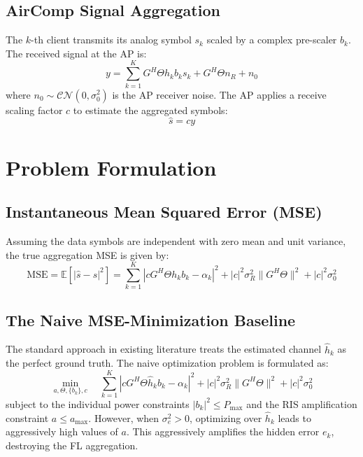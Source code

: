 \documentclass[lettersize,journal]{IEEEtran}
\begin{document}
\subsection{AirComp Signal Aggregation}
The $k$-th client transmits its analog symbol $s_k$ scaled by a complex pre-scaler $b_k$. The received signal at the AP is:
\begin{equation}
y = \sum_{k=1}^K G^H \Theta h_k b_k s_k + G^H \Theta n_R + n_0
\end{equation}
where $n_0 \sim \mathcal{CN}(0, \sigma_0^2)$ is the AP receiver noise. The AP applies a receive scaling factor $c$ to estimate the aggregated symbols:
\begin{equation}
\hat{s} = c y
\end{equation}

\section{Problem Formulation}

\subsection{Instantaneous Mean Squared Error (MSE)}
Assuming the data symbols are independent with zero mean and unit variance, the true aggregation MSE is given by:
\begin{equation}
\text{MSE} = \mathbb{E}[|\hat{s} - s|^2] = \sum_{k=1}^K |c G^H \Theta h_k b_k - \alpha_k|^2 + |c|^2 \sigma_R^2 \|G^H \Theta\|^2 + |c|^2 \sigma_0^2
\end{equation}

\subsection{The Naive MSE-Minimization Baseline}
The standard approach in existing literature treats the estimated channel $\hat{h}_k$ as the perfect ground truth. The naive optimization problem is formulated as:
\begin{equation}
\min_{a, \Theta, \{b_k\}, c} \quad \sum_{k=1}^K |c G^H \Theta \hat{h}_k b_k - \alpha_k|^2 + |c|^2 \sigma_R^2 \|G^H \Theta\|^2 + |c|^2 \sigma_0^2
\end{equation}
subject to the individual power constraints $|b_k|^2 \le P_{\max}$ and the RIS amplification constraint $a \le a_{\max}$. However, when $\sigma_e^2 > 0$, optimizing over $\hat{h}_k$ leads to aggressively high values of $a$. This aggressively amplifies the hidden error $e_k$, destroying the FL aggregation.
\end{document}
